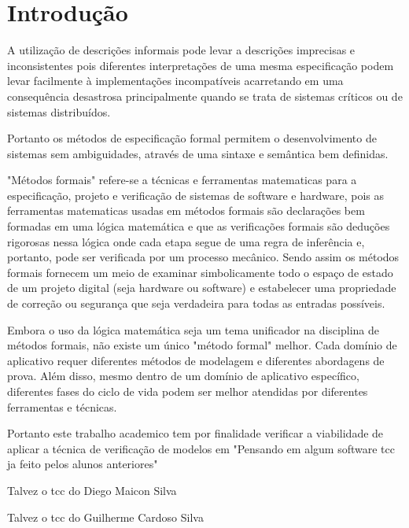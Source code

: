 \section{Introdução}

A utilização de descrições informais pode levar a descrições imprecisas e inconsistentes pois diferentes interpretações de uma mesma especificação podem levar facilmente à implementações incompatíveis acarretando em uma consequência desastrosa principalmente quando se trata de sistemas críticos ou de sistemas distribuídos. 
\cite{ufrgs}

Portanto os métodos de especificação formal permitem o desenvolvimento de sistemas sem ambiguidades, através de uma sintaxe e semântica bem definidas.  
\cite{intro}

"Métodos formais" refere-se a técnicas e ferramentas matematicas para a especificação, projeto e verificação de sistemas de software e hardware, pois as ferramentas matematicas usadas em métodos formais são declarações bem formadas em uma lógica matemática e que as verificações formais são deduções rigorosas nessa lógica onde cada etapa segue de uma regra de inferência e, portanto, pode ser verificada por um processo mecânico. Sendo assim os métodos formais fornecem um meio de examinar simbolicamente todo o espaço de estado de um projeto digital (seja hardware ou software) e estabelecer uma propriedade de correção ou segurança que seja verdadeira para todas as entradas possíveis.
\cite{nasa}

Embora o uso da lógica matemática seja um tema unificador na disciplina de métodos formais, não existe um único "método formal" melhor. Cada domínio de aplicativo requer diferentes métodos de modelagem e diferentes abordagens de prova. Além disso, mesmo dentro de um domínio de aplicativo específico, diferentes fases do ciclo de vida podem ser melhor atendidas por diferentes ferramentas e técnicas.
\cite{nasa}

Portanto este trabalho academico tem por finalidade verificar a viabilidade de aplicar a técnica de verificação de modelos em "Pensando em algum software tcc ja feito pelos alunos anteriores"

Talvez o tcc do Diego Maicon Silva

Talvez o tcc do Guilherme Cardoso Silva